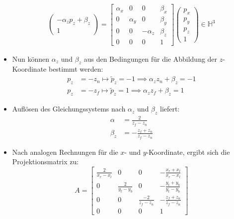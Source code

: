 \documentclass{scrartcl}
\begin{document}
\begin{itemize}
\begin{equation}
\begin{split}
\begin{pmatrix}
			-\alpha_z p_z + \beta_z \\
			1
			\end{pmatrix} = \begin{bmatrix}
			\alpha_x & 0 & 0 & \beta_x \\
			0 & \alpha_y & 0 & \beta_y \\
			0 & 0 & -\alpha_z & \beta_z \\
			0 & 0 & 0 & 1
			\end{bmatrix} \begin{pmatrix}
			p_x \\
			p_y \\
			p_z \\
			1
			\end{pmatrix} \in \mathbb{H}^3
		\end{split}
	\end{equation}
	\item Nun können $\alpha_z$ und $\beta_z$ aus den Bedingungen für die Abbildung der $z$-Koordinate bestimmt werden:
	\begin{equation}
		\begin{split}
			p_z &= -z_n \mapsto \widetilde{p}_z = -1 \implies \alpha_z z_n + \beta_z = -1 \\
			p_z &= -z_f \mapsto \widetilde{p}_z = 1 \implies \alpha_z z_f + \beta_z = 1
		\end{split}
	\end{equation}
	\item Auflösen des Gleichungssystems nach $\alpha_z$ und $\beta_z$ liefert:
	\begin{equation}
		\begin{split}
			\alpha &= \frac{2}{z_f - z_n} \\
			\beta_z &= -\frac{z_f + z_n}{z_f - z_n}
		\end{split}
	\end{equation}
	\item Nach analogen Rechnungen für die $x$- und $y$-Koordinate, ergibt sich die Projektionsmatrix zu:
	\begin{equation}
		A = \begin{bmatrix}
		\frac{2}{x_r - x_l} & 0 & 0 & -\frac{x_r + x_l}{x_r - x_l} \\
		0 & \frac{2}{y_t - y_b} & 0 & -\frac{y_t + y_b}{y_t - y_b} \\
		0 & 0 & \frac{-2}{z_f - z_n} & -\frac{z_f + z_n}{z_f - z_n} \\
		0 & 0 & 0 & 1
		\end{bmatrix}
	\end{equation}

\end{itemize}
\end{document}
